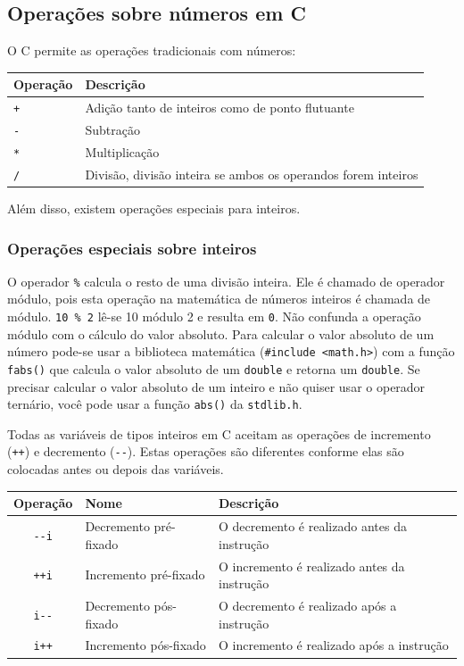 \documentclass[
]{article}
\begin{document}
\hypertarget{operauxe7uxf5es-sobre-nuxfameros-em-c}{%
\subsection{Operações sobre números em
C}\label{operauxe7uxf5es-sobre-nuxfameros-em-c}}

O C permite as operações tradicionais com números:

\begin{longtable}[]{@{}ll@{}}
\toprule
Operação & Descrição\tabularnewline
\midrule
\endhead
\texttt{+} & Adição tanto de inteiros como de ponto
flutuante\tabularnewline
\texttt{-} & Subtração\tabularnewline
\texttt{*} & Multiplicação\tabularnewline
\texttt{/} & Divisão, divisão inteira se ambos os operandos forem
inteiros\tabularnewline
\bottomrule
\end{longtable}

Além disso, existem operações especiais para inteiros.

\hypertarget{operauxe7uxf5es-especiais-sobre-inteiros}{%
\subsubsection{Operações especiais sobre
inteiros}\label{operauxe7uxf5es-especiais-sobre-inteiros}}

O operador \texttt{\%} calcula o resto de uma divisão inteira. Ele é
chamado de operador módulo, pois esta operação na matemática de números
inteiros é chamada de módulo. \texttt{10\ \%\ 2} lê-se 10 módulo 2 e
resulta em \texttt{0}. Não confunda a operação módulo com o cálculo do
valor absoluto. Para calcular o valor absoluto de um número pode-se usar
a biblioteca matemática
(\texttt{\#include\ \textless{}math.h\textgreater{}}) com a função
\texttt{fabs()} que calcula o valor absoluto de um \texttt{double} e
retorna um \texttt{double}. Se precisar calcular o valor absoluto de um
inteiro e não quiser usar o operador ternário, você pode usar a função
\texttt{abs()} da \texttt{stdlib.h}.

Todas as variáveis de tipos inteiros em C aceitam as operações de
incremento (\texttt{++}) e decremento (\texttt{-\/-}). Estas operações
são diferentes conforme elas são colocadas antes ou depois das
variáveis.

\begin{longtable}[]{@{}cll@{}}
\toprule
Operação & Nome & Descrição\tabularnewline
\midrule
\endhead
\texttt{-\/-i} & Decremento pré-fixado & O decremento é realizado antes
da instrução\tabularnewline
\texttt{++i} & Incremento pré-fixado & O incremento é realizado antes da
instrução\tabularnewline
\texttt{i-\/-} & Decremento pós-fixado & O decremento é realizado após a
instrução\tabularnewline
\texttt{i++} & Incremento pós-fixado & O incremento é realizado após a
instrução\tabularnewline
\bottomrule
\end{longtable}
\end{document}
